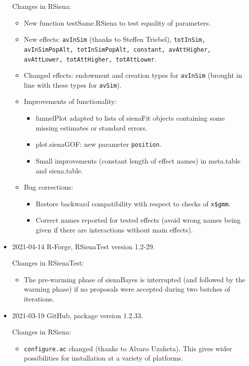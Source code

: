 \documentclass[a4paper,fleqn,11pt]{article}
\newcommand{\+}{\, + \,}
\newcommand{\sfn}[1]{\textsf{#1}}
\begin{document}
\begin{small}
\begin{itemize}
Changes in RSiena:
\begin{itemize}
\item New function \sfn{testSame.RSiena} to test equality of parameters.
\item New effects: \texttt{avInSim} (thanks to Steffen Triebel),
    \texttt{totInSim, avInSimPopAlt, totInSimPopAlt, constant,
     avAttHigher, avAttLower, totAttHigher, totAttLower}.
\item Changed effects: endowment and creation types for \texttt{avInSim}
     (brought in line with these types for \texttt{avSim}).
\item Improvements of functionality:
   \begin{itemize}
   \item \sfn{funnelPlot} adapted to lists of \sfn{sienaFit} objects
     containing some missing estimates or standard errors.
   \item \sfn{plot.sienaGOF}: new parameter \texttt{position}.
   \item Small improvements (constant length of effect names) in
     \sfn{meta.table} and \sfn{siena.table}.
    \end{itemize}
\item Bug corrections:
   \begin{itemize}
   \item Restore backward compatibility with respect to checks of \texttt{x\$gmm}.
   \item Correct names reported for tested effects (avoid wrong names being given
     if there are interactions without main effects).
    \end{itemize}
\end{itemize}


\item 2021-04-14  R-Forge, \sfn{RSienaTest} version 1.2-29.

Changes in RSienaTest:
\begin{itemize}
\item The pre-warming phase of \sfn{sienaBayes} is interrupted
    (and followed by the warming phase) if no proposals were accepted
    during two batches of iterations.
\end{itemize}

\item 2021-03-19  GitHub, package version 1.2.33.

Changes in RSiena:
\begin{itemize}
\item \texttt{configure.ac} changed (thanks to  Alvaro Uzaheta).
	This gives wider possibilities for installation at a variety of platforms.
\end{itemize}




\end{itemize}
\end{small}
\end{document}
